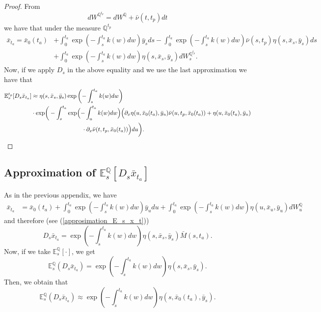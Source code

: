 \documentclass[a4paper,10pt]{article}
\newcommand{\1}{\mathbf{1}}
\begin{document}
\begin{proof}
From 
\begin{equation*}
dW^{\mathbb{Q}^{t_p}} = dW^{\mathbb{Q}} + \bar{\nu}(t,t_p) dt
\end{equation*}
we have that under the measure $\mathbb{Q}^{t_p}$ 
\begin{align*}
\bar{x}_{t_a} = \bar{x}_0(t_a) &+ \int_{0}^{t_a} \exp\left(-\int_{s}^{t_a}k(w)dw\right) \bar{y}_s ds - \int_{0}^{t_a} \exp\left(-\int_{s}^{t_a}k(w)dw\right) \bar{\nu}(s, t_p) \eta(s,\bar{x}_s,\bar{y}_s) ds   \\
&+ \int_{0}^{t_a}  \exp\left(-\int_{s}^{t_a}k(w)dw \right)\eta(s,\bar{x}_s,\bar{y}_s) dW_s^{\mathbb{Q}^{t_p}}. 
\end{align*}
Now, if we apply $D_s$ in the above equality and we use the last approximation we have that
\begin{align*}
\mathbb{E}^{t_p}_s[D_s \bar{x}_{t_a}] &\approx \eta(s,\bar{x}_s,\bar{y}_s) \exp\left(-\int_{s}^{t_a}k(w)dw \right)\\ &\cdot \exp\biggr(-\int_{s}^{t_a} \exp\Bigl(-\int_{u}^{t_a}k(w)dw\Bigr) \Bigl(\partial_x \eta(u, \bar{x}_0(t_a), \bar{y}_{u}) \bar{\nu}(u,t_p, \bar{x}_0(t_a)) + \eta(u,\bar{x}_0(t_a), \bar{y}_{u}) \\
\qquad &\hspace{3cm} \cdot \partial_x \bar{\nu} (t,t_p, \bar{x}_0(t_a))\Bigr) du\biggr).
\end{align*}
\end{proof}

\subsection{Approximation of $\mathbb{E}_s^{\mathbb{Q}}\left[D_s \bar{x}_{t_a}\right]$}
As in the previous appendix, we have
\begin{align*}
\bar{x}_{t_a} &= \bar{x}_0(t_a) + \int_{0}^{t_a} \exp\left(-\int_{s}^{t_a}k(w)dw\right) \bar{y}_u du + \int_{0}^{t_a} \exp\left(-\int_{s}^{t_a}k(w)dw \right) \eta(u,\bar{x}_u,\bar{y}_u) dW_u^{\mathbb{Q}}
\end{align*}
and therefore (see (\ref{approsimation_E_s_x_t}))
\begin{equation}
D_s \bar{x}_{t_a} =  \exp\left(-\int_{s}^{t_a}k(w)dw \right) \eta(s,\bar{x}_s,\bar{y}_{s})\bar{M}(s,t_a).
\end{equation}
Now, if we take $\mathbb{E}_s^{\mathbb{Q}}\left[\cdot\right]$, we get
\begin{equation}\label{approximation_spot_E_s_x_t}
\mathbb{E}^{\mathbb{Q}}_s\left(D_s \bar{x}_{t_a} \right)=\exp\left(-\int_{s}^{t_a}k(w)dw \right) \eta(s,\bar{x}_s,\bar{y}_{s}).
\end{equation}
Then, we obtain that
\begin{equation}\label{approximation_spot_E_s_x_t}
\mathbb{E}^{\mathbb{Q}}_s\left(D_s \bar{x}_{t_a} \right) \approx \exp\left(-\int_{s}^{t_a}k(w)dw \right) \eta(s,\bar{x}_0(t_a),\bar{y}_{s}).
\end{equation}
\end{document}
